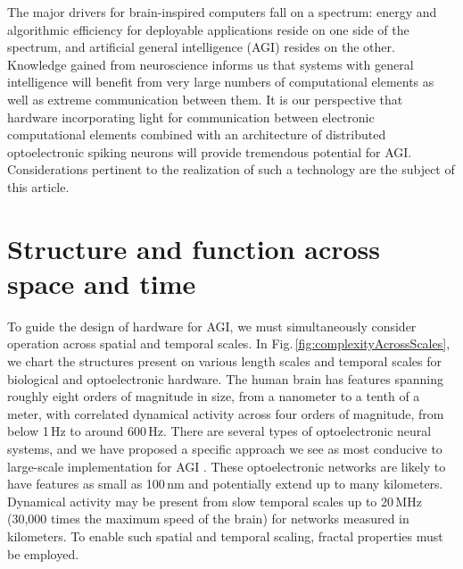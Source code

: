 \documentclass[twocolumn]{article}
\begin{document}
The major drivers for brain-inspired computers fall on a spectrum: energy and algorithmic efficiency for deployable applications reside on one side of the spectrum, and artificial general intelligence (AGI) resides on the other. Knowledge gained from neuroscience informs us that systems with general intelligence will benefit from very large numbers of computational elements as well as extreme communication between them. It is our perspective that hardware incorporating light for communication between electronic computational elements combined with an architecture of distributed optoelectronic spiking neurons will provide tremendous potential for AGI. Considerations pertinent to the realization of such a technology are the subject of this article.

\section{\label{sec:sructureAndFunction}Structure and function across space and time}
\begin{figure} 
\end{figure}
To guide the design of hardware for AGI, we must simultaneously consider operation across spatial and temporal scales. In Fig.\,\ref{fig:complexityAcrossScales}, we chart the structures present on various length scales and temporal scales for biological and optoelectronic hardware. The human brain has features spanning roughly eight orders of magnitude in size, from a nanometer to a tenth of a meter, with correlated dynamical activity across four orders of magnitude, from below 1\,Hz to around 600\,Hz. There are several types of optoelectronic neural systems, and we have proposed a specific approach we see as most conducive to large-scale implementation for AGI \cite{sh2018}. These optoelectronic networks are likely to have features as small as 100\,nm and potentially extend up to many kilometers. Dynamical activity may be present from slow temporal scales up to 20\,MHz (30,000 times the maximum speed of the brain) for networks measured in kilometers. To enable such spatial and temporal scaling, fractal properties must be employed.
\end{document}
